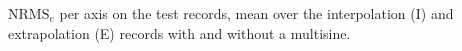 \begin{table}[t]
  \centering
  \caption{$\mathrm{NRMS}_e$ per axis on the test records, mean over the interpolation (I) and extrapolation (E) records with and without a multisine.}
  \label{tab:res_generalisation}\label{fig:res_generalisation}
  
\end{table}


